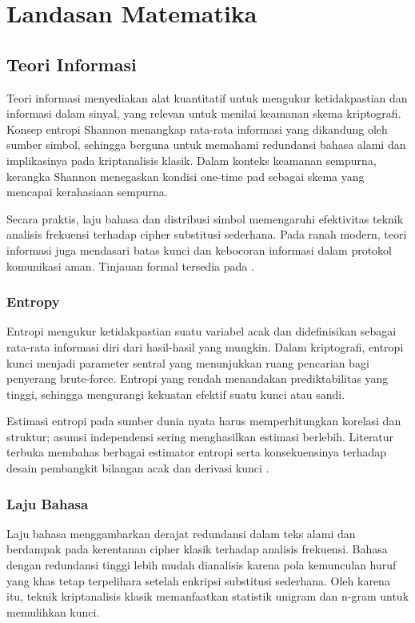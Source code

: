 \documentclass[../main.tex]{subfiles}
\begin{document}
\chapter{Landasan Matematika}

\section{Teori Informasi}
Teori informasi menyediakan alat kuantitatif untuk mengukur ketidakpastian dan informasi dalam sinyal, yang relevan untuk menilai keamanan skema kriptografi. Konsep entropi Shannon menangkap rata-rata informasi yang dikandung oleh sumber simbol, sehingga berguna untuk memahami redundansi bahasa alami dan implikasinya pada kriptanalisis klasik. Dalam konteks keamanan sempurna, kerangka Shannon menegaskan kondisi one-time pad sebagai skema yang mencapai kerahasiaan sempurna.

Secara praktis, laju bahasa dan distribusi simbol memengaruhi efektivitas teknik analisis frekuensi terhadap cipher substitusi sederhana. Pada ranah modern, teori informasi juga mendasari batas kunci dan kebocoran informasi dalam protokol komunikasi aman. Tinjauan formal tersedia pada \textcite{menezes1996handbook}.

\subsection{Entropy}
Entropi mengukur ketidakpastian suatu variabel acak dan didefinisikan sebagai rata-rata informasi diri dari hasil-hasil yang mungkin. Dalam kriptografi, entropi kunci menjadi parameter sentral yang menunjukkan ruang pencarian bagi penyerang brute-force. Entropi yang rendah menandakan prediktabilitas yang tinggi, sehingga mengurangi kekuatan efektif suatu kunci atau sandi.

Estimasi entropi pada sumber dunia nyata harus memperhitungkan korelasi dan struktur; asumsi independensi sering menghasilkan estimasi berlebih. Literatur terbuka membahas berbagai estimator entropi serta konsekuensinya terhadap desain pembangkit bilangan acak dan derivasi kunci \parencite{nist80090c}.

\subsection{Laju Bahasa}
Laju bahasa menggambarkan derajat redundansi dalam teks alami dan berdampak pada kerentanan cipher klasik terhadap analisis frekuensi. Bahasa dengan redundansi tinggi lebih mudah dianalisis karena pola kemunculan huruf yang khas tetap terpelihara setelah enkripsi substitusi sederhana. Oleh karena itu, teknik kriptanalisis klasik memanfaatkan statistik unigram dan n-gram untuk memulihkan kunci.
\end{document}
